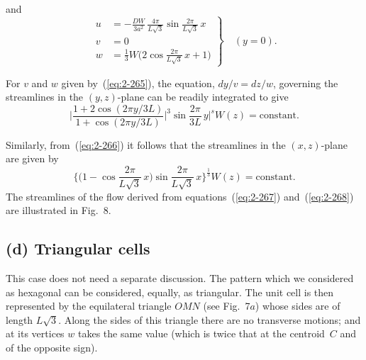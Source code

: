
and
\begin{equation}
\label{eq:2-266}
\left.
\begin{aligned}
u &= -\frac{DW}{3a^2}\,\frac{4\pi}{L\sqrt{3}}\sin\frac{2\pi}{L\sqrt{3}}\,x\\
v &= 0\\
w &= \tfrac{1}{3}W\biggl(2\cos\frac{2\pi}{L\sqrt{3}}\,x + 1\biggr)
\end{aligned}
\right\}\quad (y = 0).
\end{equation}

For $v$ and $w$ given by~(\ref{eq:2-265}), the equation, $dy/v = dz/w$, governing the
streamlines in the $(y,z)$-plane can be readily integrated to give
\begin{equation}
\label{eq:2-267}
\biggl|\frac{1+2\cos(2\pi y/3L)}{1+\cos(2\pi y/3L)}\biggr|^3\sin\frac{2\pi}{3L}\,y\biggr|^s W(z) = \text{constant}.
\end{equation}


Similarly, from~(\ref{eq:2-266}) it follows that the streamlines in the $(x,z)$-plane
are given by
\begin{equation}
\label{eq:2-268}
\biggl\{\biggl(1-\cos\frac{2\pi}{L\sqrt{3}}\,x\biggr)\sin\frac{2\pi}{L\sqrt{3}}\,x\biggr\}^{\frac{1}{3}} W(z) = \text{constant}.
\end{equation}
The streamlines of the flow derived from equations~(\ref{eq:2-267}) and~(\ref{eq:2-268}) are
illustrated in Fig.~8.

\subsection*{(d) Triangular cells}

This case does not need a separate discussion. The pattern which we
considered as hexagonal can be considered, equally, as triangular. The
unit cell is then represented by the equilateral triangle $OMN$ (see Fig.~7$a$)
whose sides are of length $L\sqrt{3}$. Along the sides of this triangle there are
no transverse motions; and at its vertices $w$ takes the same value (which
is twice that at the centroid~$C$ and of the opposite sign).

